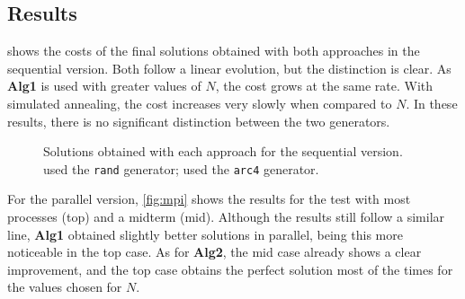 \subsection{Results}
\label{sec:results}

 shows the costs of the final solutions obtained with both approaches in the sequential version. Both follow a linear evolution, but the distinction is clear. As \textbf{Alg1} is used with greater values of $N$, the cost grows at the same rate. With simulated annealing, the cost increases very slowly when compared to $N$. In these results, there is no significant distinction between the two generators.

\begin{figure}[!htp]
	\centering
	\captionsetup[subfloat]{position=top}
	\hfill
	\caption[Sequential Solutions]{Solutions obtained with each approach for the sequential version.\\ used the \texttt{rand} generator;  used the \texttt{arc4} generator.}
	\label{fig:seq}
\end{figure}

For the parallel version, \cref{fig:mpi} shows the results for the test with most processes (top) and a midterm (mid). Although the results still follow a similar line, \textbf{Alg1} obtained slightly better solutions in parallel, being this more noticeable in the top case. As for \textbf{Alg2}, the mid case already shows a clear improvement, and the top case obtains the perfect solution most of the times for the values chosen for $N$.

